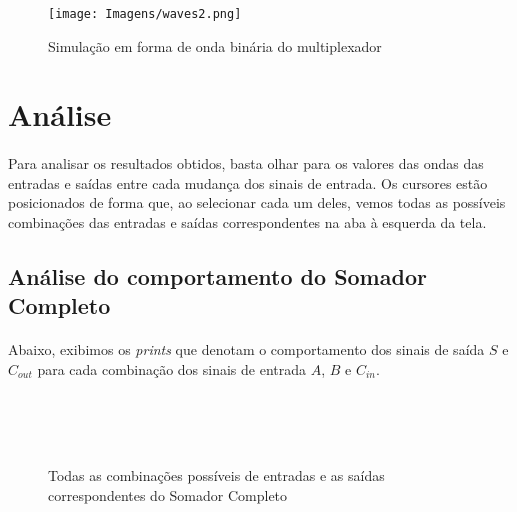 \documentclass[a4paper,12pt]{article}
\begin{document}
\begin{figure}[H]
    \centering
    \begin{tcolorbox}[colframe=darkgray, colback=white, boxrule=0.5pt, arc=1pt, width=0.95\textwidth, center, boxsep=0pt, left=0pt, right=0pt]
    \texttt{[image: Imagens/waves2.png]}
    \end{tcolorbox}
    \caption{Simulação em forma de onda binária do multiplexador}
\end{figure}

\section{Análise}

\paragraph{}
Para analisar os resultados obtidos, basta olhar para os valores das ondas das entradas e saídas entre cada mudança dos sinais de entrada. Os cursores estão posicionados de forma que, ao selecionar cada um deles, vemos todas as possíveis combinações das entradas e saídas correspondentes na aba à esquerda da tela.

\subsection{Análise do comportamento do Somador Completo}
\paragraph{}
 Abaixo, exibimos os \textit{prints} que denotam o comportamento dos sinais de saída $S$ e $C_{out}$ para cada combinação dos sinais de entrada $A$, $B$ e $C_{in}$.

\setlength{\fboxsep}{0pt} %
\begin{figure}[H]
    \centering
     \\
     \\
     \\
    \caption{Todas as combinações possíveis de entradas e as saídas correspondentes do Somador Completo}
\end{figure}
\end{document}

